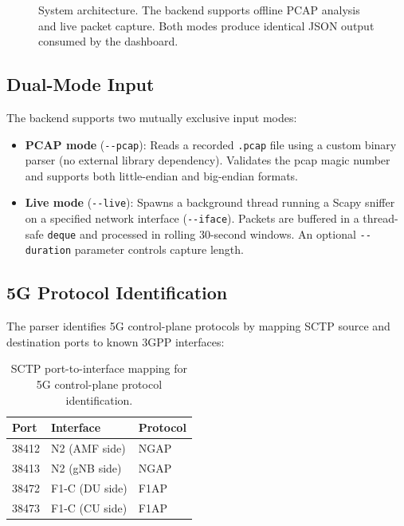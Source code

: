 \documentclass[11pt, a4paper]{article}
\begin{document}
\begin{figure}[H]
\caption{System architecture. The backend supports offline PCAP analysis and live packet capture. Both modes produce identical JSON output consumed by the dashboard.}
\label{fig:arch}
\end{figure}

\subsection{Dual-Mode Input}

The backend supports two mutually exclusive input modes:

\begin{itemize}
    \item \textbf{PCAP mode} (\texttt{-{}-pcap}): Reads a recorded \texttt{.pcap} file using a custom binary parser (no external library dependency). Validates the pcap magic number and supports both little-endian and big-endian formats.
    \item \textbf{Live mode} (\texttt{-{}-live}): Spawns a background thread running a Scapy sniffer on a specified network interface (\texttt{-{}-iface}). Packets are buffered in a thread-safe \texttt{deque} and processed in rolling 30-second windows. An optional \texttt{-{}-duration} parameter controls capture length.
\end{itemize}

\subsection{5G Protocol Identification}

The parser identifies 5G control-plane protocols by mapping SCTP source and destination ports to known 3GPP interfaces:

\begin{table}[H]
\centering
\begin{tabular}{l l l}
\toprule
\textbf{Port} & \textbf{Interface} & \textbf{Protocol} \\
\midrule
38412 & N2 (AMF side)  & NGAP \\
38413 & N2 (gNB side)  & NGAP \\
38472 & F1-C (DU side) & F1AP \\
38473 & F1-C (CU side) & F1AP \\
\bottomrule
\end{tabular}
\caption{SCTP port-to-interface mapping for 5G control-plane protocol identification.}
\label{tab:ports}
\end{table}
\end{document}
